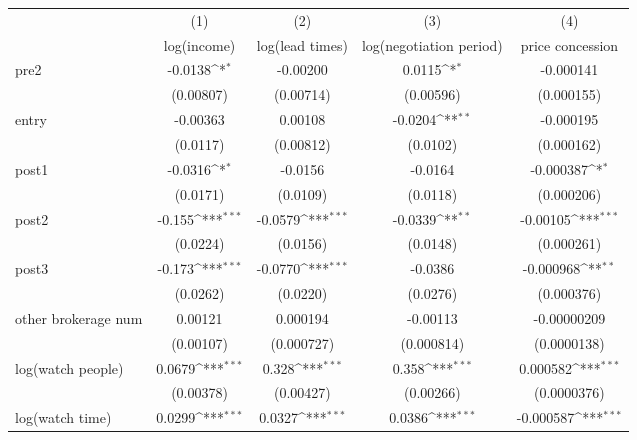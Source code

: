 {
\def\sym#1{\ifmmode^{#1}\else\(^{#1}\)\fi}
\begin{tabular}{l*{4}{c}}
\toprule
            &\multicolumn{1}{c}{(1)}&\multicolumn{1}{c}{(2)}&\multicolumn{1}{c}{(3)}&\multicolumn{1}{c}{(4)}\\
            &\multicolumn{1}{c}{log(income)}&\multicolumn{1}{c}{log(lead times)}&\multicolumn{1}{c}{log(negotiation period)}&\multicolumn{1}{c}{price concession}\\
\midrule
pre2        &     -0.0138\sym{*}  &    -0.00200         &      0.0115\sym{*}  &   -0.000141         \\
            &   (0.00807)         &   (0.00714)         &   (0.00596)         &  (0.000155)         \\
\addlinespace
entry       &    -0.00363         &     0.00108         &     -0.0204\sym{**} &   -0.000195         \\
            &    (0.0117)         &   (0.00812)         &    (0.0102)         &  (0.000162)         \\
\addlinespace
post1       &     -0.0316\sym{*}  &     -0.0156         &     -0.0164         &   -0.000387\sym{*}  \\
            &    (0.0171)         &    (0.0109)         &    (0.0118)         &  (0.000206)         \\
\addlinespace
post2       &      -0.155\sym{***}&     -0.0579\sym{***}&     -0.0339\sym{**} &    -0.00105\sym{***}\\
            &    (0.0224)         &    (0.0156)         &    (0.0148)         &  (0.000261)         \\
\addlinespace
post3       &      -0.173\sym{***}&     -0.0770\sym{***}&     -0.0386         &   -0.000968\sym{**} \\
            &    (0.0262)         &    (0.0220)         &    (0.0276)         &  (0.000376)         \\
\addlinespace
other brokerage num  &     0.00121         &    0.000194         &    -0.00113         & -0.00000209         \\
            &   (0.00107)         &  (0.000727)         &  (0.000814)         & (0.0000138)         \\
\addlinespace
log(watch people)&      0.0679\sym{***}&       0.328\sym{***}&       0.358\sym{***}&    0.000582\sym{***}\\
            &   (0.00378)         &   (0.00427)         &   (0.00266)         & (0.0000376)         \\
\addlinespace
log(watch time)&      0.0299\sym{***}&      0.0327\sym{***}&      0.0386\sym{***}&   -0.000587\sym{***}\\

\end{tabular}}
